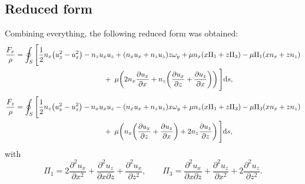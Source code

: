 \documentclass[wes, manuscript]{copernicus}
\begin{document}
\subsection{Reduced form}
Combining everything, the following reduced form was obtained:
%
\begin{equation}
\begin{aligned}
\frac{F_{x}}{\rho} &= \oint_S \Bigg[
\frac{1}{2} n_{x}\!\left(u_{z}^2-u_{x}^2\right) - n_{z} u_{x} u_{z}
+ (n_{x} u_{x}+n_{z} u_{z}) z \omega_y
+\mu n_{x}(x\Pi_1+z\Pi_3) - \mu \Pi_1(x n_{x}+z n_{z}) \\
&\hspace{4.3cm}
+\;\mu\!\left(2n_{x} \frac{\partial u_{x}}{\partial x}
+ n_{z}\!\left(\frac{\partial u_{x}}{\partial z}+\frac{\partial u_{z}}{\partial x}\right)\right)
\Bigg] \textrm{d}s , \\[1ex]
\frac{F_{z}}{\rho} &= \oint_S \Bigg[
\frac{1}{2} n_{z}\!\left(u_{x}^2-u_{z}^2\right) - n_{x} u_{x} u_{z}
- (n_{x} u_{x}+n_{z} u_{z}) x \omega_y
+\mu n_{z}(x\Pi_1+z\Pi_3) - \mu \Pi_3(x n_{x}+z n_{z}) \\
&\hspace{4.3cm}
+\;\mu\!\left(n_{x}\!\left(\frac{\partial u_{x}}{\partial z}+\frac{\partial u_{z}}{\partial x}\right)
+ 2n_{z} \frac{\partial u_{z}}{\partial z}\right)
\Bigg] \textrm{d}s ,
\end{aligned}
\end{equation}
%
with
%
\begin{equation}
\Pi_1
= 2 \frac{\partial^2 u_{x}}{\partial x^2}
+ \frac{\partial^2 u_{z}}{\partial x \partial z}
+ \frac{\partial^2 u_{x}}{\partial z^2},
\qquad
\Pi_3
= \frac{\partial^2 u_{x}}{\partial x \partial z}
+ \frac{\partial^2 u_{z}}{\partial x^2}
+ 2 \frac{\partial^2 u_{z}}{\partial z^2} .
\end{equation}
\end{document}
